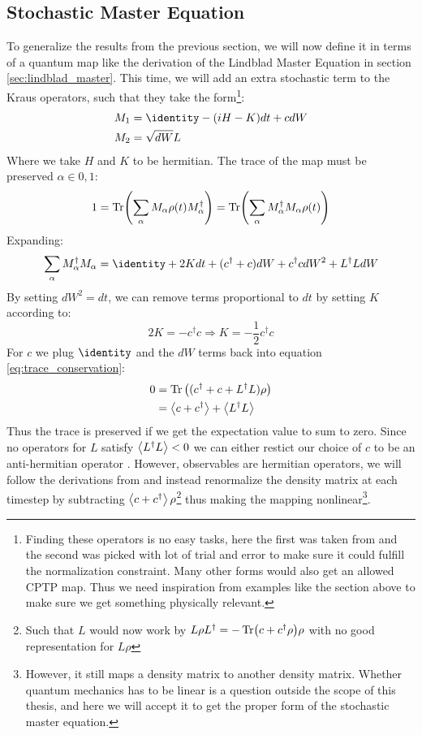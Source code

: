 \subsection{Stochastic Master Equation}
To generalize the results from the previous section, we will now define it in terms of a quantum map like the derivation of the Lindblad Master Equation in section \ref{sec:lindblad_master}. This time, we will add an extra stochastic term to the Kraus operators, such that they take the form\footnote{Finding these operators is no easy tasks, here the first was taken from \cite{jacobs_straightforward_2006} and the second was picked with lot of trial and error to make sure it could fulfill the normalization constraint. Many other forms would also get an allowed CPTP map. Thus we need inspiration from examples like the section above to make sure we get something physically relevant.}:
\begin{align}
    M_1      &=  \identity - (iH - K)dt + cdW \\
    M_2      &=  \sqrt{dW} L
\end{align}
Where we take $H$ and $K$ to be hermitian. The trace of the map must be preserved $\alpha \in {0, 1}$:
\begin{equation}
    1 = \Tr(\sum_\alpha M_\alpha \rho(t) M_\alpha^\dagger) = \Tr(\sum_\alpha M_\alpha^\dagger M_\alpha \rho(t))
\end{equation}
Expanding:
\begin{equation}\label{eq:trace_conservation}
    \sum_\alpha M_\alpha^\dagger M_\alpha = \identity + 2K dt +  (c^\dagger + c)dW + c^\dagger c dW^2 + L^\dagger L dW
\end{equation}
By setting $dW^2 = dt$, we can remove terms proportional to $dt$ by setting $K$ according to:
\begin{equation}
    2K = -c^\dagger c \Rightarrow K = -\frac12 c^\dagger c 
\end{equation}
For $c$ we plug $\identity$ and the $dW$ terms back into equation \ref{eq:trace_conservation}:
\begin{align}
    0 &= \Tr\left((c^\dagger + c + L^\dagger L)\rho \right) \\
      &= \expval{c + c^\dagger} + \expval{L^\dagger L}
\end{align}
Thus the trace is preserved if we get the expectation value to sum to zero. Since no operators for $L$ satisfy $\expval{L^\dagger L} < 0$ we can either restict our choice of $c$ to be an anti-hermitian operator \cite{adler}. However, observables are hermitian operators, we will follow the derivations from \cite{motzoi_simple_2009} and instead renormalize the density matrix at each timestep by subtracting $\expval{c + c^\dagger}\rho$\footnote{Such that $L$ would now work by $L\rho L^\dagger = - \Tr(c + c^\dagger\rho) \rho$ with no good representation for $L\rho$} thus making the mapping nonlinear\footnote{ However, it still maps a density matrix to another density matrix. Whether quantum mechanics has to be linear is a question outside the scope of this thesis, and here we will accept it to get the proper form of the stochastic master equation.}. 
